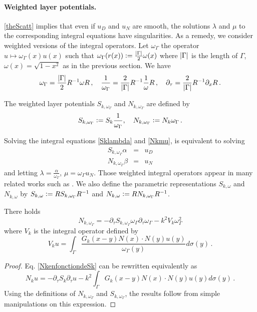 \documentclass[a4paper]{article}
\begin{document}
\paragraph{Weighted layer potentials.} \autoref{theScatt} implies that even if $u_D$ and $u_N$ are smooth, the solutions $\lambda$ and $\mu$ to the corresponding integral equations have singularities. As a remedy, we consider weighted versions of the integral operators. Let $\omega_\Gamma$ the operator $u \mapsto \omega_\Gamma(x) u(x)$ such that $\omega_\Gamma(r(x)) \mathrel{\mathop:}= \frac{\left\lvert \Gamma \right\rvert}{2}\omega(x)$ where $\left\lvert \Gamma \right\rvert$ is the length of $\Gamma$, $\omega(x) = \sqrt{1 - x^2}$ as in the previous section. We have
\begin{equation}
	\omega_\Gamma = \frac{\left\lvert \Gamma \right\rvert}{2}R^{-1} \omega R\,, \quad \frac{1}{\omega_\Gamma} = \frac{2}{\left\lvert \Gamma \right\rvert}R^{-1} \frac{1}{\omega} R\,, \quad \partial_\tau = \frac{2}{\left\lvert \Gamma \right\rvert} R^{-1}\partial_x R\,.
	\label{param}
\end{equation}
\begin{Def}
	The weighted layer potentials $S_{k,\omega_\Gamma}$ and $N_{k,\omega_\Gamma}$ are defined by
	\[S_{k,\omega_\Gamma} \mathrel{\mathop:}= S_k \frac{1}{\omega_\Gamma}, \quad N_{k,\omega_\Gamma} \mathrel{\mathop:}=  N_{k}\omega_\Gamma\,.\]
\end{Def}
\noindent Solving the integral equations \eqref{Sklambda} and \eqref{Nkmu}, is equivalent to solving
\begin{eqnarray*}
	S_{k,\omega_\Gamma} \alpha &=& u_D\\
	N_{k,\omega_\Gamma} \beta &=& u_N
\end{eqnarray*}
and letting $\lambda = \frac{\alpha}{\omega_\Gamma}$, $\mu = \omega_\Gamma u_N$. Those weighted integral operators appear in many related works such as \cite{bruno2012second,jerez2012explicit,jiang2004second}. 
We also define the parametric representations $S_{k,\omega}$ and $N_{k,\omega}$ by $S_{k,\omega} \mathrel{\mathop:}= R S_{k,\omega_\Gamma}R^{-1}$ and $N_{k,\omega} \mathrel{\mathop:}= R N_{k,\omega_\Gamma} R^{-1}$. 
\begin{Lem}
	\label{NkomegaSkomega}
	There holds 
	\[N_{k,\omega_\Gamma} = -\partial_\tau S_{k,\omega_\Gamma} \omega_\Gamma \partial_\tau \omega_\Gamma - k^2 V_k \omega_\Gamma^2\]
	where $V_k$ is the integral operator defined by 
	\[V_k u = \int_{\Gamma} \frac{G_k(x - y) N(x) \cdot N(y) u(y)}{\omega_\Gamma(y)} d\sigma(y)\,. \]
\end{Lem}
\begin{proof}
	Eq. \eqref{NkenfonctiondeSk} can be rewritten equivalently as 
	\[N_k u = -\partial_\tau S_k \partial_\tau u - k^2 \int_{\Gamma} G_k(x - y) N(x) \cdot N(y) u(y) d\sigma(y)\,. \]
	Using the definitions of $N_{k,\omega_\Gamma}$ and $S_{k,\omega_\Gamma}$, the results follow from simple manipulations on this expression. 
\end{proof}
\end{document}
